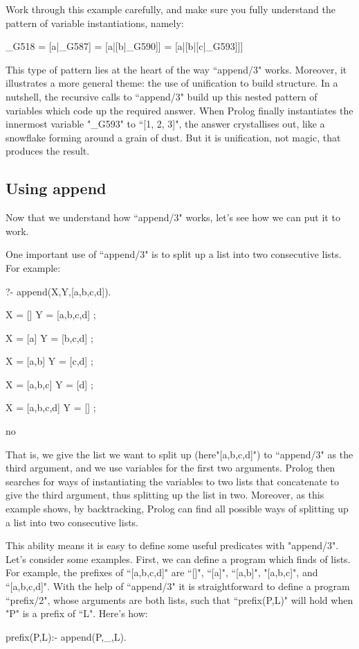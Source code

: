 Work through this example carefully, and make sure you fully
understand the pattern of variable instantiations, namely:
\begin{LPNcodedisplay}
_G518 = [a|_G587]
      = [a|[b|_G590]]
      = [a|[b|[c|_G593]]]
\end{LPNcodedisplay}
This type of pattern lies at the heart of the way ``append/3" works.
Moreover, it illustrates a more general theme: the use of unification to
build structure. In a nutshell, the recursive calls to ``append/3" build up
this nested pattern of variables which code up the required
answer. When Prolog finally instantiates the innermost variable
"\_G593" to ``[1, 2, 3]", the answer crystallises out, like a snowflake
forming around a grain of dust. But it is unification, not magic, that
produces the result.



\subsection*{Using append}\label{SUBSEC.L6.USING.APPEND}



Now that we understand how ``append/3" works,
let's see how we can put it to work.

One important use of ``append/3" is to split up a list into two
consecutive lists.  For example:
\begin{LPNcodedisplay}
?- append(X,Y,[a,b,c,d]).

X = []
Y = [a,b,c,d] ;

X = [a]
Y = [b,c,d] ;

X = [a,b]
Y = [c,d] ;

X = [a,b,c]
Y = [d] ;

X = [a,b,c,d]
Y = [] ;

no
\end{LPNcodedisplay}

That is, we give the list we want to split up (here"[a,b,c,d]")
to ``append/3" as the third argument, and we use variables for the
first two arguments.  Prolog then searches for ways of instantiating
the variables to two lists that concatenate to give the third
argument, thus splitting up the list in two. Moreover, as this example
shows, by backtracking, Prolog can find all possible ways of splitting
up a list into two consecutive lists.

This ability means it is easy to define some useful predicates with
"append/3".  Let's consider some examples.  First, we can define a
program which finds  of lists.  For example, the
prefixes of ``[a,b,c,d]" are ``[]", ``[a]", ``[a,b]",
"[a,b,c]", and ``[a,b,c,d]".  With the help of ``append/3"
it is straightforward to define a program ``prefix/2", whose
arguments are both lists, such that ``prefix(P,L)" will hold when
"P" is a prefix of ``L".  Here's how:
\begin{LPNcodedisplay}
prefix(P,L):- append(P,_,L).
\end{LPNcodedisplay}

